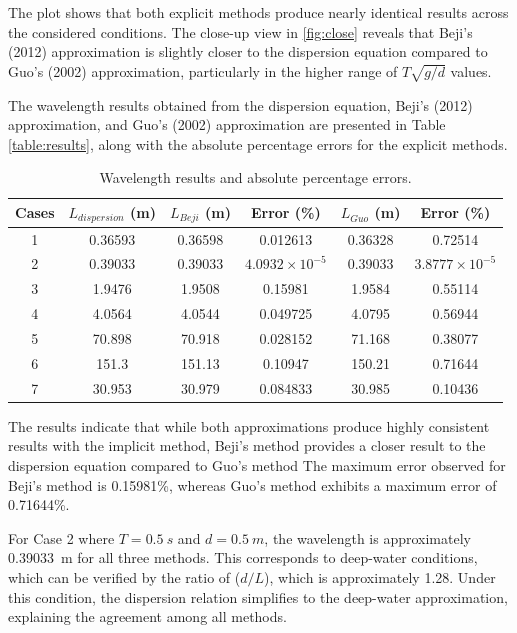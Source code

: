 \documentclass[a4paper, 11pt]{article}
\begin{document}
The plot shows that both explicit methods produce nearly identical results across the considered conditions. The close-up view in \autoref{fig:close} reveals that Beji's (2012) approximation is slightly closer to the dispersion equation compared to Guo's (2002) approximation, particularly in the higher range of $T \sqrt{g/d}$ values. 

\vspace{0.5cm}

The wavelength results obtained from the dispersion equation, Beji's (2012) approximation, and Guo's (2002) approximation are presented in Table \ref{table:results}, along with the absolute percentage errors for the explicit methods. 

\begin{table}[H]
    \centering
    \caption{Wavelength results and absolute percentage errors.}
    \begin{tabular}{|c|c|c|c|c|c|}
        \hline
        Cases & $L_{dispersion}$ (m) & $L_{Beji}$ (m) & Error (\%) & $L_{Guo}$ (m) & Error (\%) \\
        \hline
        1 & 0.36593 & 0.36598 & 0.012613 & 0.36328 & 0.72514 \\
        2 & 0.39033 & 0.39033 & $4.0932 \times 10^{-5}$ & 0.39033 & $3.8777 \times 10^{-5}$ \\
        3 & 1.9476 & 1.9508 & 0.15981 & 1.9584 & 0.55114 \\
        4 & 4.0564 & 4.0544 & 0.049725 & 4.0795 & 0.56944 \\
        5 & 70.898 & 70.918 & 0.028152 & 71.168 & 0.38077 \\
        6 & 151.3 & 151.13 & 0.10947 & 150.21 & 0.71644 \\
        7 & 30.953 & 30.979 & 0.084833 & 30.985 & 0.10436 \\
        \hline
    \end{tabular}
\end{table}
    \label{table:results}

The results indicate that while both approximations produce highly consistent results with the implicit method, Beji's method provides a closer result to the dispersion equation compared to Guo's method  The maximum error observed for Beji's method is 0.15981\%, whereas Guo's method exhibits a maximum error of 0.71644\%. 

\vspace{0.1cm}

For Case 2 where $T = 0.5~s$ and $d = 0.5~m$, the wavelength is approximately 0.39033~m for all three methods. This corresponds to deep-water conditions, which can be verified by the ratio of ($d/L$), which is approximately 1.28. Under this condition, the dispersion relation simplifies to the deep-water approximation, explaining the agreement among all methods.
\end{document}
